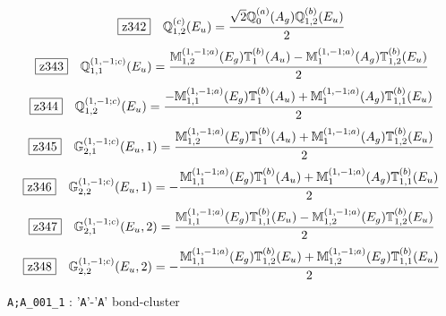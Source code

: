 \documentclass[fleqn,10pt,landscape]{jsarticle}
\begin{document}
\begin{dmath*}
\hspace*{3mm}\fbox{z342}\quad \mathbb{Q}_{1,2}^{(c)}(E_{u})=\frac{\sqrt{2} \mathbb{Q}_{0}^{(a)}(A_{g}) \mathbb{Q}_{1,2}^{(b)}(E_{u})}{2}
\end{dmath*}
\begin{dmath*}
\hspace*{3mm}\fbox{z343}\quad \mathbb{Q}_{1,1}^{(1,-1;c)}(E_{u})=\frac{\mathbb{M}_{1,2}^{(1,-1;a)}(E_{g}) \mathbb{T}_{1}^{(b)}(A_{u}) - \mathbb{M}_{1}^{(1,-1;a)}(A_{g}) \mathbb{T}_{1,2}^{(b)}(E_{u})}{2}
\end{dmath*}
\begin{dmath*}
\hspace*{3mm}\fbox{z344}\quad \mathbb{Q}_{1,2}^{(1,-1;c)}(E_{u})=\frac{- \mathbb{M}_{1,1}^{(1,-1;a)}(E_{g}) \mathbb{T}_{1}^{(b)}(A_{u}) + \mathbb{M}_{1}^{(1,-1;a)}(A_{g}) \mathbb{T}_{1,1}^{(b)}(E_{u})}{2}
\end{dmath*}
\begin{dmath*}
\hspace*{3mm}\fbox{z345}\quad \mathbb{G}_{2,1}^{(1,-1;c)}(E_{u},1)=\frac{\mathbb{M}_{1,2}^{(1,-1;a)}(E_{g}) \mathbb{T}_{1}^{(b)}(A_{u}) + \mathbb{M}_{1}^{(1,-1;a)}(A_{g}) \mathbb{T}_{1,2}^{(b)}(E_{u})}{2}
\end{dmath*}
\begin{dmath*}
\hspace*{3mm}\fbox{z346}\quad \mathbb{G}_{2,2}^{(1,-1;c)}(E_{u},1)=- \frac{\mathbb{M}_{1,1}^{(1,-1;a)}(E_{g}) \mathbb{T}_{1}^{(b)}(A_{u}) + \mathbb{M}_{1}^{(1,-1;a)}(A_{g}) \mathbb{T}_{1,1}^{(b)}(E_{u})}{2}
\end{dmath*}
\begin{dmath*}
\hspace*{3mm}\fbox{z347}\quad \mathbb{G}_{2,1}^{(1,-1;c)}(E_{u},2)=\frac{\mathbb{M}_{1,1}^{(1,-1;a)}(E_{g}) \mathbb{T}_{1,1}^{(b)}(E_{u}) - \mathbb{M}_{1,2}^{(1,-1;a)}(E_{g}) \mathbb{T}_{1,2}^{(b)}(E_{u})}{2}
\end{dmath*}
\begin{dmath*}
\hspace*{3mm}\fbox{z348}\quad \mathbb{G}_{2,2}^{(1,-1;c)}(E_{u},2)=- \frac{\mathbb{M}_{1,1}^{(1,-1;a)}(E_{g}) \mathbb{T}_{1,2}^{(b)}(E_{u}) + \mathbb{M}_{1,2}^{(1,-1;a)}(E_{g}) \mathbb{T}_{1,1}^{(b)}(E_{u})}{2}
\end{dmath*}
\vspace{5mm}

\noindent\textbullet\, \texttt{A;A_001_1} : '\texttt{A}'-'\texttt{A}' bond-cluster
\end{document}
